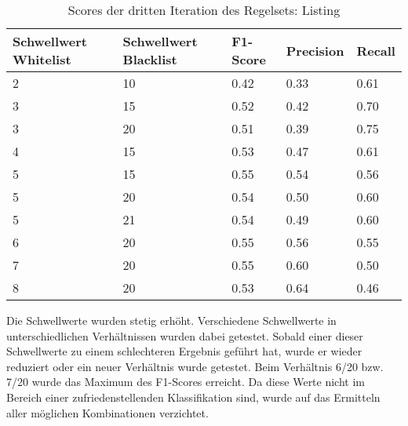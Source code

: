 \begin{table}[H]
	\caption{Scores der dritten Iteration des Regelsets: Listing}
	\centering
\begin{tabular}{|l|l|l|l|l|}
	\hline
	Schwellwert Whitelist & Schwellwert Blacklist & F1-Score & Precision & Recall\\
	\hline
	2 & 10 & 0.42 & 0.33 & 0.61 \\
	3 & 15 & 0.52 & 0.42 & 0.70 \\
	3 & 20 & 0.51 & 0.39 & 0.75 \\
	4 & 15 & 0.53 & 0.47 & 0.61 \\
	5 & 15 & 0.55 & 0.54 & 0.56 \\
	5 & 20 & 0.54 & 0.50 & 0.60 \\
	5 & 21 & 0.54 & 0.49 & 0.60 \\
	6 & 20 & 0.55 & 0.56 & 0.55 \\
	7 & 20 & 0.55 & 0.60 & 0.50 \\
	8 & 20 & 0.53 & 0.64 & 0.46 \\
	\hline
\end{tabular}
\end{table}
Die Schwellwerte wurden stetig erhöht.
Verschiedene Schwellwerte in unterschiedlichen Verhältnissen wurden dabei getestet.
Sobald einer dieser Schwellwerte zu einem schlechteren Ergebnis geführt hat, wurde er wieder reduziert oder ein neuer Verhältnis wurde getestet.
Beim Verhältnis 6/20 bzw. 7/20 wurde das Maximum des F1-Scores erreicht.
Da diese Werte nicht im Bereich einer zufriedenstellenden Klassifikation sind, wurde auf das Ermitteln aller möglichen Kombinationen verzichtet.
